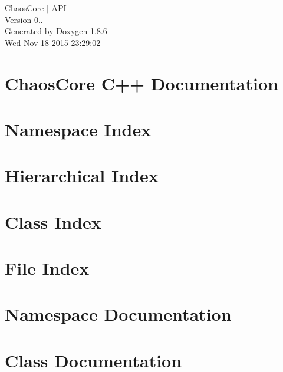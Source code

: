 \documentclass[twoside]{book}
\newcommand{\clearemptydoublepage}{%
  \newpage{\pagestyle{empty}\cleardoublepage}%
}
\begin{document}
\hypersetup{pageanchor=false}
\begin{titlepage}
\vspace*{7cm}
\begin{center}%
{\Large Chaos\-Core $\vert$ A\-P\-I \\[1ex]\large Version 0.. }\\
\vspace*{1cm}
{\large Generated by Doxygen 1.8.6}\\
\vspace*{0.5cm}
{\small Wed Nov 18 2015 23:29:02}\\
\end{center}
\end{titlepage}
\clearemptydoublepage
\tableofcontents
\clearemptydoublepage
{}
\hypersetup{pageanchor=true}

\chapter{Chaos\-Core C++ Documentation}
\label{index}\hypertarget{index}{}
\chapter{Namespace Index}

\chapter{Hierarchical Index}

\chapter{Class Index}

\chapter{File Index}

\chapter{Namespace Documentation}












\chapter{Class Documentation}











\end{document}
